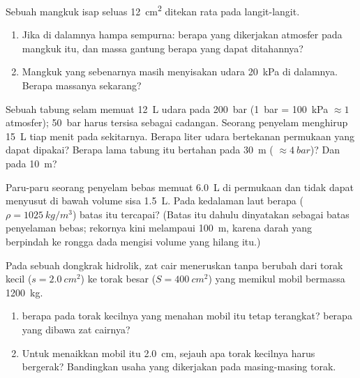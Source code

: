 \begin{exercise}[$\star\star\star$]\label{exo:g10:pressure:12}
Sebuah mangkuk isap seluas \qty{12}{cm^2} ditekan rata pada langit-langit.
\begin{enumerate}
  \item Jika di dalamnya hampa sempurna: berapa  yang dikerjakan
        atmosfer pada mangkuk itu, dan massa gantung berapa yang dapat
        ditahannya?
  \item Mangkuk yang sebenarnya masih menyisakan udara \qty{20}{kPa} di
        dalamnya. Berapa massanya sekarang?
\end{enumerate}
\end{exercise}

\begin{exercise}[$\star\star\star$]\label{exo:g10:pressure:13}
Sebuah tabung selam memuat \qty{12}{L} udara pada \qty{200}{bar}
(\qty{1}{bar} = \qty{100}{kPa} $\approx 1$ atmosfer); \qty{50}{bar}
harus tersisa sebagai cadangan. Seorang penyelam menghirup \qty{15}{L}
tiap menit pada  sekitarnya. Berapa liter udara bertekanan
permukaan yang dapat dipakai? Berapa lama tabung itu bertahan pada
\qty{30}{m} ( $\approx \qty{4}{bar}$)? Dan pada
\qty{10}{m}?
\end{exercise}

\begin{exercise}[$\star\star\star$]\label{exo:g10:pressure:14}
Paru-paru seorang penyelam bebas memuat \qty{6.0}{L} di permukaan dan
tidak dapat menyusut di bawah volume sisa \qty{1.5}{L}. Pada kedalaman
laut berapa ($\rho = \qty{1025}{kg/m^3}$) batas itu tercapai? (Batas
itu dahulu dinyatakan sebagai batas penyelaman bebas; rekornya kini
melampaui \qty{100}{m}, karena darah yang berpindah ke rongga dada
mengisi volume yang hilang itu.)
\end{exercise}

\begin{exercise}[$\star\star\star$]\label{exo:g10:pressure:15}
Pada sebuah dongkrak hidrolik, zat cair meneruskan  tanpa
berubah dari torak kecil ($s = \qty{2.0}{cm^2}$) ke torak besar
($S = \qty{400}{cm^2}$) yang memikul mobil bermassa \qty{1200}{kg}.
\begin{enumerate}
  \item {} berapa pada torak kecilnya yang menahan mobil itu tetap
        terangkat?  berapa yang dibawa zat cairnya?
  \item Untuk menaikkan mobil itu \qty{2.0}{cm}, sejauh apa torak
        kecilnya harus bergerak? Bandingkan usaha yang dikerjakan pada
        masing-masing torak.
\end{enumerate}
\end{exercise}

